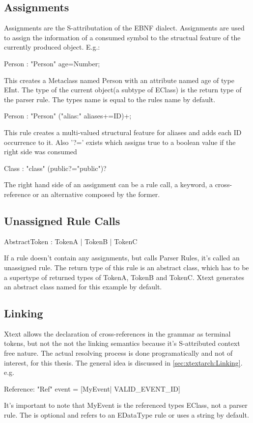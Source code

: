 \subsection{Assignments}
Assignments are the S-attributation of the EBNF dialect. Assignments are used to assign the information of a consumed symbol to the structual feature of the currently produced object. E.g.:
\begin{xtxt}
Person : "Person" age=Number;
\end{xtxt}
This creates a Metaclass named Person with an attribute named age of type EInt. 
The type of the current object(a subtype of EClass) is the return type of the parser rule. The types name is equal to the rules name by default.
\begin{xtxt}
Person : "Person" ("alias:" aliases+=ID)+;
\end{xtxt}
This rule creates a multi-valued structural feature for aliases and adds each ID occurrence to it. Also '?=' exists which assigns true to a boolean value if the right side was consumed
\begin{xtxt}
Class : "class" (public?="public")?
\end{xtxt}

The right hand side of an assignment can be a rule call, a keyword, a cross-reference or an alternative composed by the former.

\subsection{Unassigned Rule Calls}
\begin{xtxt}
AbstractToken :	TokenA |	TokenB |	TokenC
\end{xtxt}
If a rule doesn't contain any assignments, but calls Parser Rules, it's called an unassigned rule. The return type of this rule is an abstract class, which has to be a supertype of returned types of TokenA, TokenB and TokenC. Xtext generates an abstract class named  for this example by default.

\subsection{Linking}
Xtext allows the declaration of cross-references in the grammar as terminal tokens, but not the not the linking semantics because it's S-attributed context free nature. The actual resolving process is done programatically and not of interest, for this thesis. The general idea is discussed in \ref{sec:xtextarch:Linking}.
e.g. 
\begin{xtxt}
Reference:  "Ref" event = [MyEvent| VALID_EVENT_ID]
\end{xtxt}
It's important to note that MyEvent is the referenced types EClass, not a parser rule. The   is optional and refers to an EDataType rule or uses a string by default.


